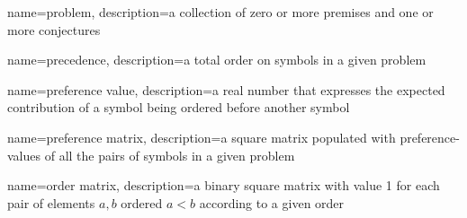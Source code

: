 \usepackage{glossaries}
\makeglossaries


{
	name=problem,
	description={a collection of zero or more premises and one or more conjectures}
}

{
	name=precedence,
	description={a total order on symbols in a given \gls{problem}}
}

{
	name=preference value,
	description={a real number that expresses the expected contribution of a symbol being ordered before another symbol}
}

{
	name=preference matrix,
	description={a square matrix populated with \glspl{preference-value} of all the pairs of symbols in a given \gls{problem}}
}

{
	name=order matrix,
	description={a binary square matrix with value 1 for each pair of elements \(a, b\) ordered \(a < b\) according to a given order}
}
